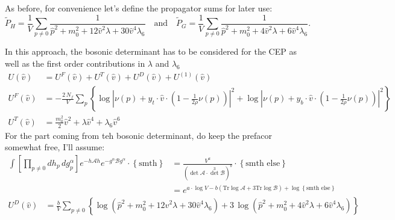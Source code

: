 As before, for convenience let's define the propagator sums for later use:
\begin{equation}\label{eq:propagatorSum_improved_inBrokenPhase}
\tilde P_H = \frac{1}{V} \sum\limits_{p\neq 0} \frac{1}{ \hat p^2 + m_0^2 + 12 \hat v^2 \lambda + 30 \hat v^4 \lambda_6 } \quad\text{and}\quad
\tilde P_G = \frac{1}{V} \sum\limits_{p\neq 0} \frac{1}{ \hat p^2 + m_0^2 + 4 \hat v^2 \lambda + 6 \hat v^4 \lambda_6 }.
\end{equation}

In this approach, the bosonic determinant has to be considered for the CEP as well as the first order contributions in $\lambda$ and $\lambda_6$
\begin{align}
      \label{eq:CEP_improved_inBrokenPhase_all}
 U(\hat v) & = U^F(\hat v) + U^T(\hat v) + U^D(\hat v) + U^{(1)}(\hat v) 
            \\
      \label{eq:CEP_improved_inBrokenPhase_Fermion}
 U^F(\hat v) & = -\frac{2\, N_f}{V} \sum\limits_p \left\{
                  \log\left| \nu(p) + y_t \cdot \hat v \cdot \left( 1-\frac{1}{2 \rho} \nu(p) \right) \right|^2 +
                  \log\left| \nu(p) + y_b \cdot \hat v \cdot \left( 1-\frac{1}{2 \rho} \nu(p) \right) \right|^2 \right\}
            \\
      \label{eq:CEP_improved_inBrokenPhase_Tree}
 U^T(\hat v) & = \frac{m_0^2}{2} \hat v^2 + \lambda \hat v^4 + \lambda_6 \hat v^6
\end{align}
% 
% 
For the part coming from teh bosonic determinant, do keep the prefacor somewhat free, I'll assume:
\begin{align}
		\label{eq:CEP_deriv_of_bosonic_determinant}
	\int \left[ \prod\limits_{p\neq 0} dh_p\, dg^{\alpha}_p \right] e^{-h \mathcal{A} h} e^{-g^{\alpha} \mathcal{B} g^{\alpha}} \cdot \left\{ \text{smth} \right\}& = 
						\frac{V^{a}}{\left(\det \mathcal{A} \cdot \det^3 \mathcal{B}\right)^b}\cdot \left\{ \text{smth else} \right\} \\
				& = e^{a\cdot \log V - b\left( \text{Tr} \log \mathcal{A} + 3 \text{Tr} \log\mathcal{B} \right) + \log \left\{\text{smth else}\right\} } 
\end{align}
\begin{align}
             \label{eq:CEP_improved_inBrokenPhase_BosDet}
 U^D(\hat v) & = \frac{b}{V}\sum\limits_{p \neq 0} \left\{
                  \log \left( \hat p^2 + m_0^2 + 12 \hat v^2 \lambda + 30 \hat v^4 \lambda_6 \right) + 
                  3\, \log \left( \hat p^2 + m_0^2 + 4 \hat v^2 \lambda + 6 \hat v^4 \lambda_6 \right) \right\}
\end{align}
